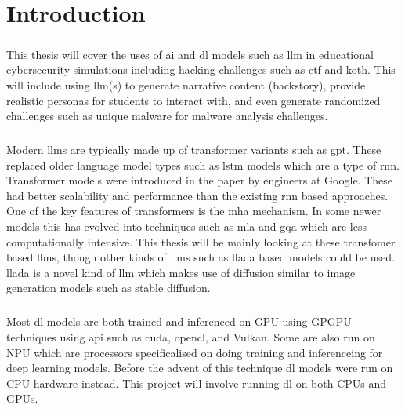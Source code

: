 \chapter{Introduction}

\paragraph{}This thesis will cover the uses of \acrfull{ai} and \acrfull{dl} models such as \acrfull{llm} in educational cybersecurity simulations including hacking challenges such as \acrfull{ctf} and \acrfull{koth}. This will include using \acrshort{llm}(s) to generate narrative content (backstory), provide realistic personas for students to interact with, and even generate randomized challenges such as unique malware for malware analysis challenges.

\paragraph{}Modern \acrshort{llm}s are typically made up of transformer variants such as \acrfull{gpt}. These replaced older language model types such as \acrfull{lstm} models which are a type of \acrfull{rnn}. Transformer models were introduced in the paper \textcite{vaswani_attention_2023} by engineers at Google. These had better scalability and performance than the existing \acrlong{rnn} based approaches. One of the key features of transformers is the \acrfull{mha} mechanism. In some newer models this has evolved into techniques such as \acrfull{mla} and \acrfull{gqa} which are less computationally intensive. This thesis will be mainly looking at these transfomer based \acrshort{llm}s, though other kinds of \acrshort{llm}s such as \acrfull{llada} based models could be used. \acrshort{llada} is a novel kind of \acrshort{llm} which makes use of diffusion similar to image generation models such as stable diffusion.

\paragraph{}Most \acrlong{dl} models are both trained and inferenced on \acrfull{GPU} using \acrfull{GPGPU} techniques using \acrfull{api} such as \acrfull{cuda}, \acrfull{opencl}, and Vulkan. Some are also run on \acrfull{NPU} which are processors specificalised on doing training and inferenceing for deep learning models. Before the advent of this technique \acrlong{dl} models were run on \acrfull{CPU} hardware instead. This project will involve running \acrlong{dl} on both \acrshort{CPU}s and \acrshort{GPU}s.